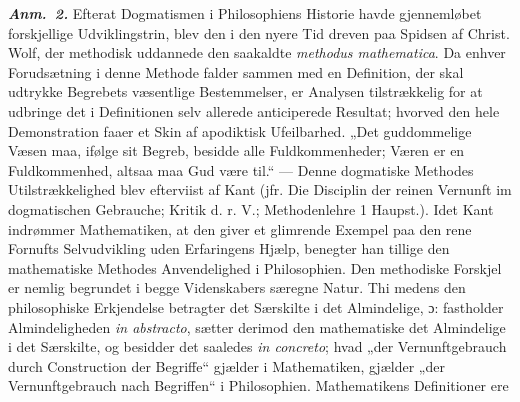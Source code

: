 \documentclass[12pt]{book}
\newcommand{\anm}[1]{\emph{\textbf{Anm.~#1.}}}
\newcommand{\dsi}{\textup{ɔ:}}
\newcommand{\opage}[1]{\marginnote{\footnotesize\textit{[#1]}}}
\begin{document}
\anm{2} Efterat Dogmatismen i Philosophiens Historie havde gjennemløbet forskjellige
Udviklingstrin, blev den i den nyere Tid dreven paa Spidsen af Christ. Wolf, der
\opage{91} %
methodisk uddannede den saakaldte \textit{methodus mathematica}. Da enhver
Forudsætning i denne Methode falder sammen med en Definition, der skal udtrykke
Begrebets væsentlige Bestemmelser, er Analysen tilstrækkelig for at udbringe det i
Definitionen selv allerede anticiperede Resultat; hvorved den hele Demonstration
faaer et Skin af apodiktisk Ufeilbarhed. „Det guddommelige Væsen maa, ifølge sit
Begreb, besidde alle Fuldkommenheder; Væren er en Fuldkommenhed, altsaa maa Gud være
til.“ --- Denne dogmatiske Methodes Utilstrækkelighed blev efterviist af Kant (jfr.
Die Disciplin der reinen Vernunft im dogmatischen Gebrauche; Kritik d. r. V.;
Methodenlehre 1 Haupst.). Idet Kant indrømmer Mathematiken, at den giver et glimrende
Exempel paa den rene Fornufts Selvudvikling uden Erfaringens Hjælp, benegter han
tillige den mathematiske Methodes Anvendelighed i Philosophien. Den methodiske
Forskjel er nemlig begrundet i begge Videnskabers særegne Natur. Thi medens den
philosophiske Erkjendelse betragter det Særskilte i det Almindelige, \dsi{}
fastholder Almindeligheden \textit{in abstracto}, sætter derimod den mathematiske det
Almindelige i det Særskilte, og besidder det saaledes \textit{in concreto}; hvad „der
Vernunftgebrauch durch Construction der Begriffe“ gjælder i Mathematiken, gjælder
„der Vernunftgebrauch nach Begriffen“ i Philosophien. Mathematikens Definitioner ere
\end{document}
